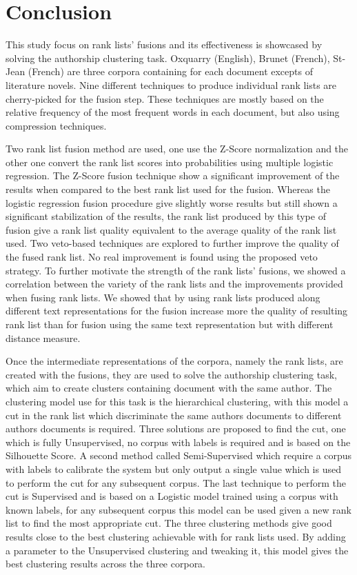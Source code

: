 \section{Conclusion \label{sec:conclusion}}

This study focus on rank lists' fusions and its effectiveness is showcased by solving the authorship clustering task.
Oxquarry (English), Brunet (French), St-Jean (French) are three corpora containing for each document excepts of literature novels.
Nine different techniques to produce individual rank lists are cherry-picked for the fusion step.
These techniques are mostly based on the relative frequency of the most frequent words in each document, but also using compression techniques.

Two rank list fusion method are used, one use the Z-Score normalization and the other one convert the rank list scores into probabilities using multiple logistic regression.
The Z-Score fusion technique show a significant improvement of the results when compared to the best rank list used for the fusion.
Whereas the logistic regression fusion procedure give slightly worse results but still shown a significant stabilization of the results, the rank list produced by this type of fusion give a rank list quality equivalent to the average quality of the rank list used.
Two veto-based techniques are explored to further improve the quality of the fused rank list.
No real improvement is found using the proposed veto strategy.
To further motivate the strength of the rank lists' fusions, we showed a correlation between the variety of the rank lists and the improvements provided when fusing rank lists.
We showed that by using rank lists produced along different text representations for the fusion increase more the quality of resulting rank list than for fusion using the same text representation but with different distance measure.

Once the intermediate representations of the corpora, namely the rank lists, are created with the fusions, they are used to solve the authorship clustering task, which aim to create clusters containing document with the same author.
The clustering model use for this task is the hierarchical clustering, with this model a cut in the rank list which discriminate the same authors documents to different authors documents is required.
Three solutions are proposed to find the cut, one which is fully Unsupervised, no corpus with labels is required and is based on the Silhouette Score.
A second method called Semi-Supervised which require a corpus with labels to calibrate the system but only output a single value which is used to perform the cut for any subsequent corpus.
The last technique to perform the cut is Supervised and is based on a Logistic model trained using a corpus with known labels, for any subsequent corpus this model can be used given a new rank list to find the most appropriate cut.
The three clustering methods give good results close to the best clustering achievable with for rank lists used.
By adding a parameter to the Unsupervised clustering and tweaking it, this model gives the best clustering results across the three corpora.
